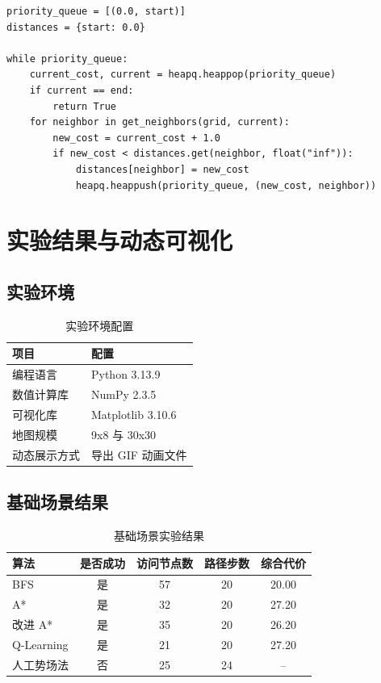 \documentclass[12pt,a4paper,fontset=none]{ctexart}
\begin{document}
\begin{lstlisting}[caption={Dijkstra 的核心实现}]
priority_queue = [(0.0, start)]
distances = {start: 0.0}

while priority_queue:
    current_cost, current = heapq.heappop(priority_queue)
    if current == end:
        return True
    for neighbor in get_neighbors(grid, current):
        new_cost = current_cost + 1.0
        if new_cost < distances.get(neighbor, float("inf")):
            distances[neighbor] = new_cost
            heapq.heappush(priority_queue, (new_cost, neighbor))
\end{lstlisting}

\section{实验结果与动态可视化}

\subsection{实验环境}

\begin{table}[H]
\centering
\caption{实验环境配置}
\begin{tabular}{ll}
\toprule
项目 & 配置 \\
\midrule
编程语言 & Python 3.13.9 \\
数值计算库 & NumPy 2.3.5 \\
可视化库 & Matplotlib 3.10.6 \\
地图规模 & 9x8 与 30x30 \\
动态展示方式 & 导出 GIF 动画文件 \\
\bottomrule
\end{tabular}
\end{table}

\subsection{基础场景结果}

\begin{table}[H]
\centering
\caption{基础场景实验结果}
\begin{tabular}{lcccc}
\toprule
算法 & 是否成功 & 访问节点数 & 路径步数 & 综合代价 \\
\midrule
BFS & 是 & 57 & 20 & 20.00 \\
A* & 是 & 32 & 20 & 27.20 \\
改进 A* & 是 & 35 & 20 & 26.20 \\
Q-Learning & 是 & 21 & 20 & 27.20 \\
人工势场法 & 否 & 25 & 24 & -- \\
\bottomrule
\end{tabular}
\end{table}
\end{document}

